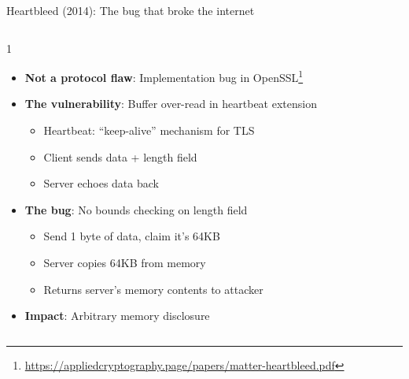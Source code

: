 \documentclass[aspectratio=169, lualatex, handout]{beamer}
\begin{document}
\begin{frame}{Heartbleed (2014): The bug that broke the internet}
	\begin{columns}[c]
		\begin{column}{1\textwidth}
			\begin{itemize}[<+->]
				\item \textbf{Not a protocol flaw}: Implementation bug in OpenSSL\footnote{\url{https://appliedcryptography.page/papers/matter-heartbleed.pdf}}
				\item \textbf{The vulnerability}: Buffer over-read in heartbeat extension
				      \begin{itemize}
					      \item Heartbeat: ``keep-alive'' mechanism for TLS
					      \item Client sends data + length field
					      \item Server echoes data back
				      \end{itemize}
				\item \textbf{The bug}: No bounds checking on length field
				      \begin{itemize}
					      \item Send 1 byte of data, claim it's 64KB
					      \item Server copies 64KB from memory
					      \item Returns server's memory contents to attacker
				      \end{itemize}
				\item \textbf{Impact}: Arbitrary memory disclosure
			\end{itemize}
		\end{column}
	\end{columns}
\end{frame}
\end{document}
